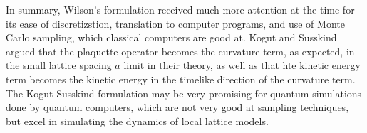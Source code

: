 \noindent In summary, Wilson's formulation received much more attention at the time for its ease of discretizstion, translation to computer programs, and use of Monte Carlo sampling, which classical computers are good at. Kogut and Susskind argued that the plaquette operator becomes the curvature term, as expected, in the small lattice spacing $a$ limit in their theory, as well as that hte kinetic energy term becomes the kinetic energy in the timelike direction of the curvature term. The Kogut-Susskind formulation may be very promising for quantum simulations done by quantum computers, which are not very good at sampling techniques, but excel in simulating the dynamics of local lattice models.